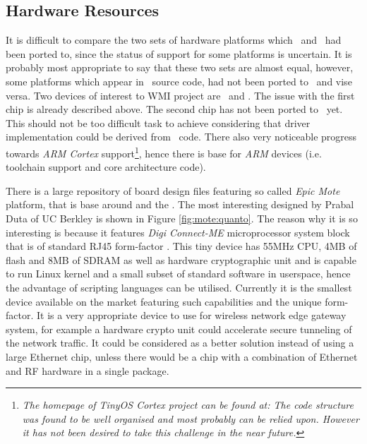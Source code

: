 \subsection{Hardware Resources}

  It is difficult to compare the two sets of hardware platforms which
 \TinyOS\ and \Contiki\ had been ported to, since the status of support
 for some platforms is uncertain. It is probably most appropriate to
 say that these two sets are almost equal, however, some platforms
 which appear in \Contiki\ source code, had not been ported to \TinyOS\
 and vise versa. Two devices of interest to WMI project are \RFA\ and
 \MCX. The issue with the first chip is already described above.
 The second chip has not been ported to \TinyOS\ yet. This should not
 be too difficult task to achieve considering that driver implementation
 could be derived from \Contiki\ code. There also very noticeable
 progress towards \emph{ARM Cortex} support\footnote{\emph{The homepage
 of TinyOS Cortex project can be found at:
 The code structure was found to be well organised and most probably
 can be relied upon. However it has not been desired to take this
 challenge in the near future.}}, hence there is base for \emph{ARM}
 devices (i.e. toolchain support and core architecture code).
 

  There is a large repository of board design files featuring so called
 \emph{Epic Mote} platform, that is base around \Chip{CC2420} and the
 \Chip{MSP430} \cite{links:epic}. The most interesting designed by
 Prabal Duta of UC Berkley \cite{duta:homepage} is shown in Figure
 \ref{fig:mote:quanto}. The reason why it is so interesting is because
 it features \emph{Digi Connect-ME} microprocessor system block that is
 of standard RJ45 form-factor \cite{links:digi:cme}. This tiny device
 has 55MHz \Chip{ARM7TDMI} CPU, 4MB of flash and 8MB of SDRAM as well as
 hardware cryptographic unit and is capable to run Linux kernel and a
 small subset of standard software in userspace, hence the advantage of
 scripting languages can be utilised. Currently it is the smallest
 device available on the market featuring such capabilities and
 the unique form-factor. It is a very appropriate device to use for
 wireless network edge gateway system, for example a hardware crypto
 unit could accelerate secure tunneling of the network traffic. It
 could be considered as a better solution instead of using a large
 Ethernet chip, unless there would be a chip with a combination of
 Ethernet and RF hardware in a single package.

